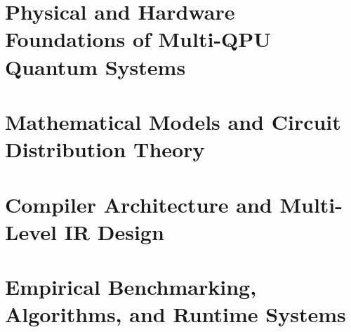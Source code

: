 \documentclass[11pt,twoside,openright,a4paper]{book}
\begin{document}
\frontmatter







\tableofcontents
\listoffigures
\listoftables

\mainmatter

\part{Physical and Hardware Foundations of Multi-QPU Quantum Systems}




\part{Mathematical Models and Circuit Distribution Theory}




\part{Compiler Architecture and Multi-Level IR Design}




\part{Empirical Benchmarking, Algorithms, and Runtime Systems}



\end{document}
